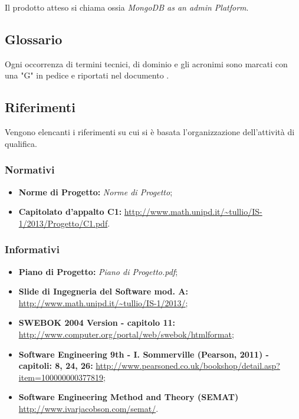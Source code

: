 Il prodotto atteso si chiama  ossia \emph{MongoDB as an admin Platform}. 

\subsection{Glossario}
Ogni occorrenza di termini tecnici, di dominio e gli acronimi sono marcati con una "G" in pedice e riportati nel documento \Glossario{}.

\subsection{Riferimenti}
Vengono elencanti i riferimenti su cui si è basata l'organizzazione dell'attività di qualifica.
	\subsubsection{Normativi}
		\begin{itemize}
  			\item \textbf{Norme di Progetto:}  \emph{Norme di Progetto};
			\item \textbf{Capitolato d'appalto C1:} \url{http://www.math.unipd.it/~tullio/IS-1/2013/Progetto/C1.pdf}.
		\end{itemize}
	\subsubsection{Informativi}
		\begin{itemize}
  			\item \textbf{Piano di Progetto:} \emph{Piano di Progetto.pdf};
  			\item \textbf{Slide di Ingegneria del Software mod. A:} \url{http://www.math.unipd.it/~tullio/IS-1/2013/};
  			\item \textbf{SWEBOK 2004 Version - capitolo 11:} \url{http://www.computer.org/portal/web/swebok/htmlformat}; 
  			\item \textbf{Software Engineering 9th - I. Sommerville (Pearson, 2011) - capitoli: 8, 24, 26:} \url{http://www.pearsoned.co.uk/bookshop/detail.asp?item=100000000377819};
  			\item \textbf{Software Engineering Method and Theory (SEMAT)} \url{http://www.ivarjacobson.com/semat/}.
		\end{itemize}

